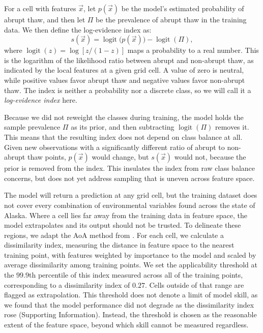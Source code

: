 \documentclass[../main.tex]{subfiles}
\begin{document}
For a cell with features $\vec{x}$, let $p(\vec{x})$ be the model's estimated probability of abrupt thaw, and then let $\Pi$ be the prevalence of abrupt thaw in the training data. We then define the log-evidence index as:
\begin{equation}\label{eq:logevidence}
    s(\vec{x}) = \operatorname{logit}\!\big(p(\vec{x})\big) - \operatorname{logit}(\Pi),
\end{equation}
where $\operatorname{logit}(z) = \log\!\left[z/(1-z)\right]$ maps a probability to a real number. This is the logarithm of the likelihood ratio between abrupt and non-abrupt thaw, as indicated by the local features at a given grid cell. A value of zero is neutral, while positive values favor abrupt thaw and negative values favor non-abrupt thaw. The index is neither a probability nor a discrete class, so we will call it a \textit{log-evidence index} here.

Because we did not reweight the classes during training, the model holds the sample prevalence $\Pi$ as its prior, and then subtracting $\operatorname{logit}(\Pi)$ removes it. This means that the resulting index does not depend on class balance at all. Given new observations with a significantly different ratio of abrupt to non-abrupt thaw points, $p(\vec{x})$ would change, but $s(\vec{x})$ would not, because the prior is removed from the index. This insulates the index from raw class balance concerns, but does not yet address sampling that is uneven across feature space.

The model will return a prediction at any grid cell, but the training dataset does not cover every combination of environmental variables found across the state of Alaska. Where a cell lies far away from the training data in feature space, the model extrapolates and its output should not be trusted. To delineate these regions, we adapt the AoA method from . For each cell, we calculate a dissimilarity index, measuring the distance in feature space to the nearest training point, with features weighted by importance to the model and scaled by average dissimilarity among training points. We set the applicability threshold at the $99.9$th percentile of this index measured across all of the training points, corresponding to a dissimilarity index of $0.27$. Cells outside of that range are flagged as extrapolation. This threshold does not denote a limit of model skill, as we found that the model performance did not degrade as the dissimilarity index rose (Supporting Information). Instead, the threshold is chosen as the reasonable extent of the feature space, beyond which skill cannot be measured regardless.
\end{document}
